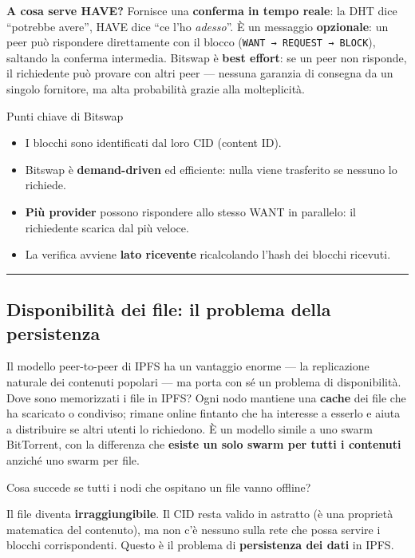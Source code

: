 \documentclass[
  italian,
  openany]{book}
\providecommand{\tightlist}{%
  \setlength{\itemsep}{0pt}\setlength{\parskip}{0pt}}
\begin{document}
\textbf{A cosa serve HAVE?} Fornisce una \textbf{conferma in tempo
reale}: la DHT dice ``potrebbe avere'', HAVE dice ``ce l'ho
\emph{adesso}''. È un messaggio \textbf{opzionale}: un peer può
rispondere direttamente con il blocco
(\texttt{WANT\ →\ REQUEST\ →\ BLOCK}), saltando la conferma intermedia.
Bitswap è \textbf{best effort}: se un peer non risponde, il richiedente
può provare con altri peer --- nessuna garanzia di consegna da un
singolo fornitore, ma alta probabilità grazie alla molteplicità.

\begin{callouttip}{Punti chiave di Bitswap}

\begin{itemize}
\tightlist
\item
  I blocchi sono identificati dal loro CID (content ID).
\item
  Bitswap è \textbf{demand-driven} ed efficiente: nulla viene trasferito
  se nessuno lo richiede.
\item
  \textbf{Più provider} possono rispondere allo stesso WANT in
  parallelo: il richiedente scarica dal più veloce.
\item
  La verifica avviene \textbf{lato ricevente} ricalcolando l'hash dei
  blocchi ricevuti.
\end{itemize}

\end{callouttip}

\begin{center}\rule{0.5\linewidth}{0.5pt}\end{center}

\subsection{Disponibilità dei file: il problema della
persistenza}\label{disponibilituxe0-dei-file-il-problema-della-persistenza}

Il modello peer-to-peer di IPFS ha un vantaggio enorme --- la
replicazione naturale dei contenuti popolari --- ma porta con sé un
problema di disponibilità. Dove sono memorizzati i file in IPFS? Ogni
nodo mantiene una \textbf{cache} dei file che ha scaricato o condiviso;
rimane online fintanto che ha interesse a esserlo e aiuta a distribuire
se altri utenti lo richiedono. È un modello simile a uno swarm
BitTorrent, con la differenza che \textbf{esiste un solo swarm per tutti
i contenuti} anziché uno swarm per file.

\begin{calloutwarning}{Cosa succede se tutti i nodi che ospitano un file vanno offline?}

Il file diventa \textbf{irraggiungibile}. Il CID resta valido in
astratto (è una proprietà matematica del contenuto), ma non c'è nessuno
sulla rete che possa servire i blocchi corrispondenti. Questo è il
problema di \textbf{persistenza dei dati} in IPFS.

\end{calloutwarning}
\end{document}
